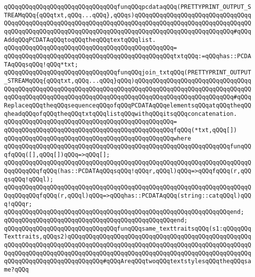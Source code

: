 \newline
\newline
\verb|qQQqqQQqqQQqqQQqqQQqqQQqqQQqqQQqfunqQQqpcdataqQQq(PRETTYPRINT_OUTPUT_STREAMqQQq{qQQqtxt,qQQq...qQQq},qQQqs)qQQqqQQqqQQqqQQqqQQqqQQqqQQqqQQqqQQqqQQqqQQqqQQqqQQqqQQqqQQqqQQqqQQqqQQqqQQqqQQqqQQqqQQqqQQqqQQqqQQqqQQqqQQqqQQqqQQqqQQqqQQqqQQqqQQqqQQqqQQqqQQqqQQqqQQqqQQqqQQqqQQqqQQq#qQQqAddqQQqPCDATAqQQqtoqQQqtheqQQqtextqQQqlist.|\newline
\verb|qQQqqQQqqQQqqQQqqQQqqQQqqQQqqQQqqQQqqQQqqQQqqQQq=|\newline
\verb|qQQqqQQqqQQqqQQqqQQqqQQqqQQqqQQqqQQqqQQqqQQqqQQqtxtqQQq:=qQQqhas::PCDATAqQQqsqQQq!qQQq*txt;|\newline
\newline
\verb|qQQqqQQqqQQqqQQqqQQqqQQqqQQqqQQqfunqQQqjoin_txtqQQq(PRETTYPRINT_OUTPUT_STREAMqQQq{qQQqtxt,qQQq...qQQq}qQQq)qQQqqQQqqQQqqQQqqQQqqQQqqQQqqQQqqQQqqQQqqQQqqQQqqQQqqQQqqQQqqQQqqQQqqQQqqQQqqQQqqQQqqQQqqQQqqQQqqQQqqQQqqQQqqQQqqQQqqQQqqQQqqQQqqQQqqQQqqQQqqQQqqQQqqQQqqQQqqQQqqQQqqQQq#qQQqReplaceqQQqtheqQQqsequenceqQQqofqQQqPCDATAqQQqelementsqQQqatqQQqtheqQQqheadqQQqofqQQqtheqQQqtxtqQQqlistqQQqwithqQQqitsqQQqconcatenation.|\newline
\verb|qQQqqQQqqQQqqQQqqQQqqQQqqQQqqQQqqQQqqQQqqQQqqQQq=|\newline
\verb|qQQqqQQqqQQqqQQqqQQqqQQqqQQqqQQqqQQqqQQqqQQqqQQqfqQQq(*txt,qQQq[])|\newline
\verb|qQQqqQQqqQQqqQQqqQQqqQQqqQQqqQQqqQQqqQQqqQQqqQQqwhere|\newline
\verb|qQQqqQQqqQQqqQQqqQQqqQQqqQQqqQQqqQQqqQQqqQQqqQQqqQQqqQQqqQQqqQQqfunqQQqfqQQq([],qQQq[])qQQq=>qQQq[];|\newline
\verb|qQQqqQQqqQQqqQQqqQQqqQQqqQQqqQQqqQQqqQQqqQQqqQQqqQQqqQQqqQQqqQQqqQQqqQQqqQQqqQQqfqQQq(has::PCDATAqQQqsqQQq!qQQqr,qQQql)qQQq=>qQQqfqQQq(r,qQQqsqQQq!qQQql);|\newline
\verb|qQQqqQQqqQQqqQQqqQQqqQQqqQQqqQQqqQQqqQQqqQQqqQQqqQQqqQQqqQQqqQQqqQQqqQQqqQQqqQQqfqQQq(r,qQQql)qQQq=>qQQqhas::PCDATAqQQq(string::catqQQql)qQQq!qQQqr;|\newline
\verb|qQQqqQQqqQQqqQQqqQQqqQQqqQQqqQQqqQQqqQQqqQQqqQQqqQQqqQQqqQQqqQQqend;|\newline
\verb|qQQqqQQqqQQqqQQqqQQqqQQqqQQqqQQqqQQqqQQqqQQqqQQqend;|\newline
\newline
\verb|qQQqqQQqqQQqqQQqqQQqqQQqqQQqqQQqfunqQQqsame_texttraitsqQQq(s1:qQQqqQQqTexttraits,qQQqs2)qQQqqQQqqQQqqQQqqQQqqQQqqQQqqQQqqQQqqQQqqQQqqQQqqQQqqQQqqQQqqQQqqQQqqQQqqQQqqQQqqQQqqQQqqQQqqQQqqQQqqQQqqQQqqQQqqQQqqQQqqQQqqQQqqQQqqQQqqQQqqQQqqQQqqQQqqQQqqQQqqQQqqQQqqQQqqQQqqQQqqQQqqQQqqQQqqQQqqQQqqQQqqQQqqQQqqQQqqQQq#qQQqAreqQQqtwoqQQqtextstylesqQQqtheqQQqsame?qQQq|\newline
